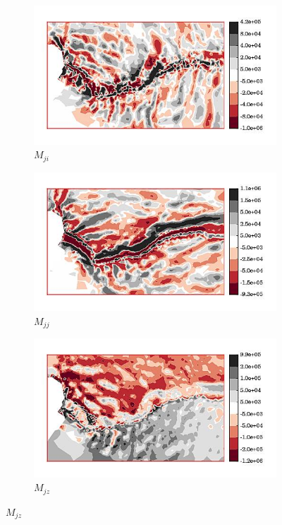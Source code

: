 \begin{figure}
  \begin{subfigure}[b]{0.32\linewidth}
    \includegraphics[width=\linewidth]{images/internal_energy/jakob_results/inversion_Wc_0.01/stress_balance/M_ji.jpg}
  \caption{$M_{ji}$}
  \label{M_ji}
  \end{subfigure}
  \begin{subfigure}[b]{0.32\linewidth}
    \includegraphics[width=\linewidth]{images/internal_energy/jakob_results/inversion_Wc_0.01/stress_balance/M_jj.jpg}
  \caption{$M_{jj}$}
  \label{M_jj}
  \end{subfigure}
  \begin{subfigure}[b]{0.32\linewidth}
    \includegraphics[width=\linewidth]{images/internal_energy/jakob_results/inversion_Wc_0.01/stress_balance/M_jz.jpg}
  \caption{$M_{jz}$}
  \label{M_jz}
  \end{subfigure}


\end{figure}
